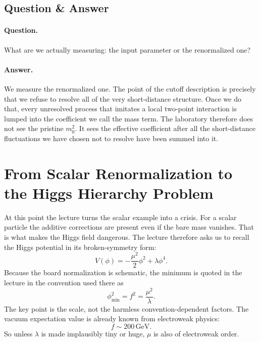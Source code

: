 \subsection{Question \& Answer}

\paragraph{Question.} What are we actually measuring: the input parameter or the renormalized one?

\paragraph{Answer.} We measure the renormalized one. The point of the cutoff description is precisely that we refuse to resolve all of the very short-distance structure. Once we do that, every unresolved process that imitates a local two-point interaction is lumped into the coefficient we call the mass term. The laboratory therefore does not see the pristine \(m_0^2\). It sees the effective coefficient after all the short-distance fluctuations we have chosen not to resolve have been summed into it.

\section{From Scalar Renormalization to the Higgs Hierarchy Problem}

At this point the lecture turns the scalar example into a crisis. For a scalar particle the additive corrections are present even if the bare mass vanishes. That is what makes the Higgs field dangerous. The lecture therefore asks us to recall the Higgs potential in its broken-symmetry form:
\begin{equation}
V(\phi)=-\frac{\mu^2}{2}\phi^2+\lambda\phi^4.
\end{equation}
Because the board normalization is schematic, the minimum is quoted in the lecture in the convention used there as
\begin{equation}
\phi_{\min}^2=f^2=\frac{\mu^2}{\lambda}.
\end{equation}
The key point is the scale, not the harmless convention-dependent factors. The vacuum expectation value is already known from electroweak physics:
\begin{equation}
f\sim 200\,\mathrm{GeV}.
\end{equation}
So unless \(\lambda\) is made implausibly tiny or huge, \(\mu\) is also of electroweak order.

